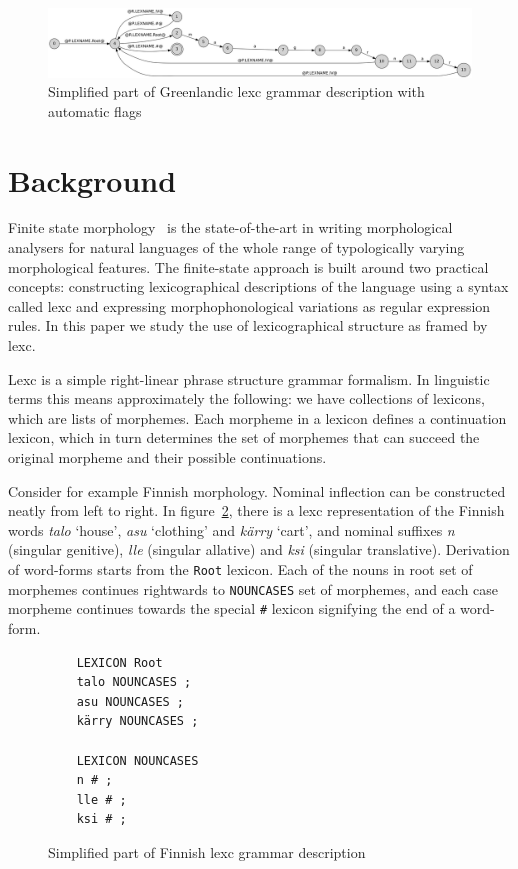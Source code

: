 \documentclass[10pt, a4paper]{article}
\begin{document}
\begin{figure}
    \includegraphics[width=\textwidth]{gr.png}
     \caption{Simplified part of Greenlandic lexc grammar description with automatic flags
     \label{fig:lexc-gr-flag}}
\end{figure}

\section{Background}

\label{sec:background}

Finite state morphology~\cite{beesley2003finite} is the
state-of-the-art in writing morphological analysers for natural
languages of the whole range of typologically varying morphological
features. The finite-state approach is built around two practical
concepts: constructing lexicographical descriptions of the language
using a syntax called lexc and expressing morphophonological
variations as regular expression rules. In this paper we study the use
of lexicographical structure as framed by lexc. 

Lexc is a simple right-linear phrase structure grammar formalism. In
linguistic terms this means approximately the following: we have
collections of lexicons, which are lists of morphemes. Each morpheme
in a lexicon defines a continuation lexicon, which in turn determines
the set of morphemes that can succeed the original morpheme and their
possible continuations.

Consider for example Finnish morphology. Nominal inflection can be
constructed neatly from left to right. In figure~\ref{fig:lexc-fin},
there is a lexc representation of the Finnish words \emph{talo} `house',
\emph{asu} `clothing' and \emph{kärry} `cart', and nominal suffixes
\emph{n} (singular genitive), \emph{lle} (singular allative) and
\emph{ksi} (singular translative). Derivation of word-forms starts
from the \texttt{Root} lexicon. Each of the nouns in root set of morphemes
continues rightwards to \texttt{NOUNCASES} set of morphemes, and each
case morpheme continues towards the special \texttt{\#} lexicon
signifying the end of a word-form.




\begin{figure}
    \centering
    \begin{verbatim}
    LEXICON Root
    talo NOUNCASES ;
    asu NOUNCASES ;
    kärry NOUNCASES ;

    LEXICON NOUNCASES
    n # ;
    lle # ;
    ksi # ;
    \end{verbatim}
    \caption{Simplified part of Finnish lexc grammar description
    \label{fig:lexc-fin}}
\end{figure}
\end{document}

